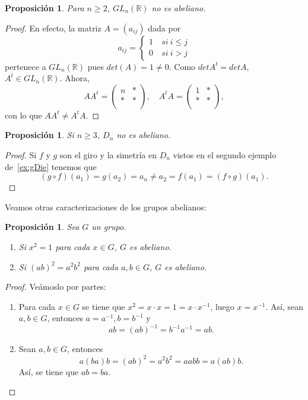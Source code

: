 \documentclass[12pt]{article}
\newtheorem{proposition}[theorem]{Proposición}
\begin{document}
\begin{proposition}Para $n \geq 2$, $GL_n(\mathbb{R})$ no es abeliano.
\end{proposition}
\begin{proof}
En efecto, la matriz $A = (a_{ij})$ dada por $$a_{ij} = \left\{
    \begin{array}{ll}
        1 &~si~i \leq j \\
        0 &~si~ i >j
    \end{array}
\right.$$
pertenece a $GL_n(\mathbb{R})$ pues $det(A)= 1 \neq 0$. Como $det A^t = det A$, $A^t \in GL_n(\mathbb{R})$. Ahora, $$AA^t = \left(
\begin{array}{c|c}
    n & \ast \\ \hline
    \ast & \ast \\
\end{array}
\right), \quad A^tA = \left(
\begin{array}{c|c}
    1 & \ast \\ \hline
    \ast & \ast \\
\end{array}
\right),$$
con lo que $AA^t \neq A^tA$.

\end{proof}

\begin{proposition}\label{prop:abDie} Si $n \geq 3$, $D_n$ no es abeliano.
\end{proposition}
\begin{proof}
Si $f$ y $g$ son el giro y la simetría en $D_n$ vistos en el segundo ejemplo de~\ref{ex:gDie} tenemos que $$(g \circ f)(a_1) = g(a_2) = a_n \neq a_2 = f(a_1) = (f\circ g)(a_1).$$

\end{proof}

Veamos otras caracterizaciones de los grupos abelianos:

\begin{proposition}Sea $G$ un grupo. 
\begin{enumerate}
\item Si $x^2 = 1$ para cada $x \in G$, $G$ es abeliano.
\item Si $(ab)^2 = a^2b^2$ para cada $a,b \in G$, $G$ es abeliano.
\end{enumerate}
\end{proposition}
\begin{proof} Veámoslo por partes:
\begin{enumerate}
\item Para cada $x \in G$ se tiene que $x^2 = x \cdot x = 1 = x \cdot x^{-1}$, luego $x = x^{-1}$. Así, sean $a,b \in G$, entonces $a = a^{-1}, b = b^{-1}$ y $$ab = (ab)^{-1} = b^{-1}a^{-1} = ab.$$
\item Sean $a,b \in G$, entonces $$a(ba)b = (ab)^2 = a^2b^2 = aabb = a(ab)b.$$ Así, se tiene que $ab = ba$.
\end{enumerate}

\end{proof}
\end{document}
